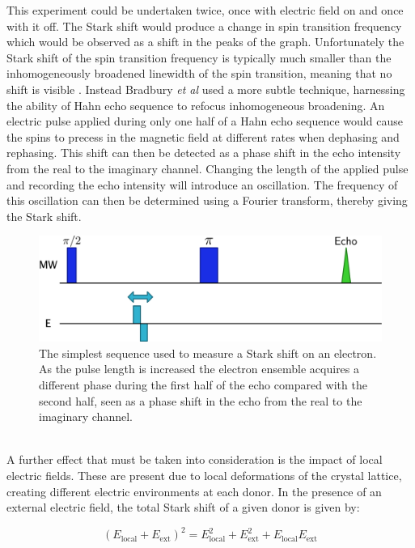 This experiment could be undertaken twice, once with electric field on and once with it off. 
The Stark shift would produce a change in spin transition frequency which would be observed as a shift in the peaks of the graph.
Unfortunately the Stark shift of the spin transition frequency is typically much smaller than the inhomogeneously broadened linewidth of the spin transition, meaning that no shift is visible \cite{Bradbury2007}. 
Instead Bradbury \emph{et al} used a more subtle technique, harnessing the ability of Hahn echo sequence to refocus inhomogeneous broadening. 
An electric pulse applied during only one half of a Hahn echo sequence would cause the spins to precess in the magnetic field at different rates when dephasing and rephasing. 
This shift can then be detected as a phase shift in the echo intensity from the real to the imaginary channel. 
Changing the length of the applied pulse and recording the echo intensity will introduce an oscillation. 
The frequency of this oscillation can then be determined using a Fourier transform, thereby giving the Stark shift.
\begin{figure}
\centering
\includegraphics[width=\columnwidth]{Figures/StarkShiftSequenceBasic.pdf}
\caption[Stark shift sequence]{The simplest sequence used to measure a Stark shift on an electron. As the pulse length is increased the electron ensemble acquires a different phase during the first half of the echo compared with the second half, seen as a phase shift in the echo from the real to the imaginary channel.}
\label{fig:starkseq}
\end{figure}
\\
A further effect that must be taken into consideration is the impact of local electric fields. 
These are present due to local deformations of the crystal lattice, creating different electric environments at each donor.
In the presence of an external electric field, the total Stark shift of a given donor is given by: 

\begin{equation}
\left (E_{\text{local}} + E_{\text{ext}} \right)^2 = E_{\text{local}}^2 + E_{\text{ext}}^2 + E_{\text{local}}E_{\text{ext}}
\end{equation}

